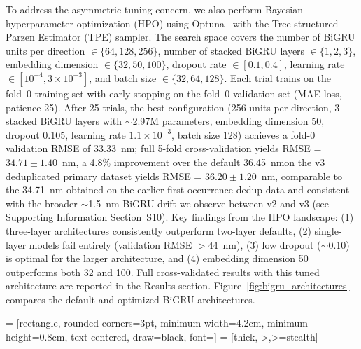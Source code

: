 \documentclass[journal=jcisd8,manuscript=article]{achemso}
\newcommand{\added}[1]{{\color{addedblue}#1}}
\newcommand{\removed}[1]{{\color{removedred}#1}}
\begin{document}
To address the asymmetric tuning concern, we also perform Bayesian hyperparameter optimization (HPO) using Optuna~\cite{akiba2019optuna} with the Tree-structured Parzen Estimator (TPE) sampler.
The search space covers the number of BiGRU units per direction $\in \{64, 128, 256\}$, number of stacked BiGRU layers $\in \{1, 2, 3\}$, embedding dimension $\in \{32, 50, 100\}$, dropout rate $\in [0.1, 0.4]$, learning rate $\in [10^{-4}, 3 \times 10^{-3}]$, and batch size $\in \{32, 64, 128\}$.
Each trial trains on the fold~0 training set with early stopping on the fold~0 validation set (MAE loss, patience 25).
After 25 trials, the best configuration (256 units per direction, 3 stacked BiGRU layers with $\sim$2.97M parameters, embedding dimension 50, dropout 0.105, learning rate $1.1 \times 10^{-3}$, batch size 128) achieves a fold-0 validation RMSE of 33.33~nm; full 5-fold cross-validation \removed{yields RMSE = $34.71 \pm 1.40$~nm, a 4.8\% improvement over the default 36.45~nm}\added{on the v3 deduplicated primary dataset yields RMSE = $36.20 \pm 1.20$~nm, comparable to the 34.71~nm obtained on the earlier first-occurrence-dedup data and consistent with the broader $\sim$1.5~nm BiGRU drift we observe between v2 and v3 (see Supporting Information Section~S10)}.
Key findings from the HPO landscape: (1) three-layer architectures consistently outperform two-layer defaults, (2) single-layer models fail entirely (validation RMSE $>$44~nm), (3) low dropout ($\sim$0.10) is optimal for the larger architecture, and (4) embedding dimension 50 outperforms both 32 and 100.
Full cross-validated results with this tuned architecture are reported in the Results section.
Figure~\ref{fig:bigru_architectures} compares the default and optimized BiGRU architectures.

 = [rectangle, rounded corners=3pt, minimum width=4.2cm, minimum height=0.8cm, text centered, draw=black, font=\small]
 = [thick,->,>=stealth]
\end{document}
